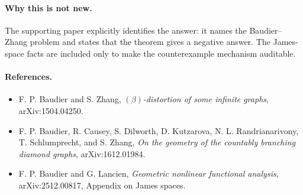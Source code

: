 \documentclass[11pt]{article}
\begin{document}
\paragraph{Why this is not new.}
The supporting paper explicitly identifies the answer: it names the
Baudier--Zhang problem and states that the theorem gives a negative answer.
The James-space facts are included only to make the counterexample mechanism
auditable.

\paragraph{References.}
\begin{itemize}
\item F. P. Baudier and S. Zhang, \emph{\((\beta)\)-distortion of some infinite graphs}, arXiv:1504.04250.
\item F. P. Baudier, R. Causey, S. Dilworth, D. Kutzarova, N. L. Randrianarivony, T. Schlumprecht, and S. Zhang, \emph{On the geometry of the countably branching diamond graphs}, arXiv:1612.01984.
\item F. P. Baudier and G. Lancien, \emph{Geometric nonlinear functional analysis}, arXiv:2512.00817, Appendix on James spaces.
\end{itemize}
\end{document}
